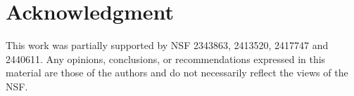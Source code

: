 \documentclass[11pt]{article}
\begin{document}
\section{Acknowledgment}
This work was partially supported by NSF 2343863, 2413520, 2417747 and 2440611. Any opinions, conclusions, or recommendations expressed in this material are those of the authors and do not necessarily reflect the views of the NSF.

\end{document}
